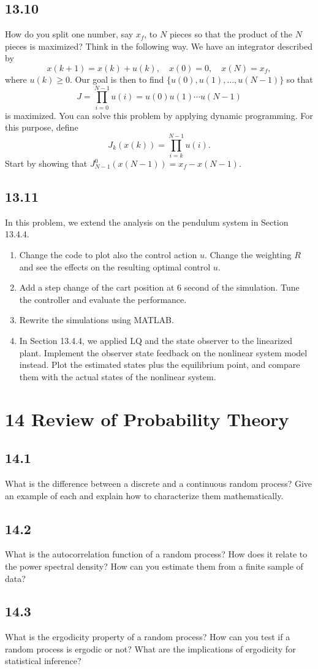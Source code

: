 \documentclass{article}
\newcommand{\problem}[2]{\subsection*{#1}}
\begin{document}
\problem{13.10}{}
How do you split one number, say $x_f$, to $N$ pieces so that the product of the $N$ pieces is maximized? Think in the following way. We have an integrator described by
\[
x(k + 1) = x(k) + u(k), \quad x(0) = 0, \quad x(N) = x_f,
\]
where $u(k) \ge 0$. Our goal is then to find $\{u(0), u(1), \dots, u(N - 1)\}$ so that
\[
J = \prod_{i=0}^{N-1} u(i) = u(0)u(1) \cdots u(N - 1)
\]
is maximized. You can solve this problem by applying dynamic programming. For this purpose, define
\[
J_k(x(k)) = \prod_{i=k}^{N-1} u(i).
\]
Start by showing that $J_{N-1}^0(x(N - 1)) = x_f - x(N - 1)$.

\problem{13.11}{}
In this problem, we extend the analysis on the pendulum system in Section 13.4.4.
\begin{enumerate}
\item Change the code to plot also the control action $u$. Change the weighting $R$ and see the effects on the resulting optimal control $u$.
\item Add a step change of the cart position at 6 second of the simulation. Tune the controller and evaluate the performance.
\item Rewrite the simulations using MATLAB.
\item In Section 13.4.4, we applied LQ and the state observer to the linearized plant. Implement the observer state feedback on the nonlinear system model instead. Plot the estimated states plus the equilibrium point, and compare them with the actual states of the nonlinear system.
\end{enumerate}

\section*{14 Review of Probability Theory}

\problem{14.1}{random-process-concepts}
What is the difference between a discrete and a continuous random process? Give an example of each and explain how to characterize them mathematically.

\problem{14.2}{random-process-concepts}
What is the autocorrelation function of a random process? How does it relate to the power spectral density? How can you estimate them from a finite sample of data?

\problem{14.3}{random-process-concepts}
What is the ergodicity property of a random process? How can you test if a random process is ergodic or not? What are the implications of ergodicity for statistical inference?
\end{document}
